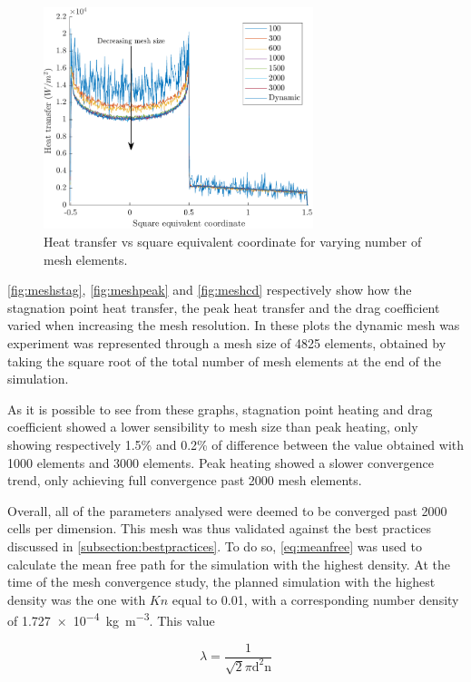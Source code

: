 \begin{figure}
    \centering
    \includegraphics[width=0.7\textwidth]{Images/3. Methodology/Mesh convergence/meshsec.pdf}
    \caption{Heat transfer vs square equivalent coordinate for varying number of mesh elements.}
    \label{fig:meshsec}
\end{figure}

\autoref{fig:meshstag}, \autoref{fig:meshpeak} and \autoref{fig:meshcd} respectively show how the stagnation point heat transfer, the peak heat transfer and the drag coefficient varied when increasing the mesh resolution. In these plots the dynamic mesh was experiment was represented through a mesh size of 4825 elements, obtained by taking the square root of the total number of mesh elements at the end of the simulation.

As it is possible to see from these graphs, stagnation point heating and drag coefficient showed a lower sensibility to mesh size than peak heating, only showing respectively 1.5\% and 0.2\% of difference between the value obtained with 1000 elements and 3000 elements. Peak heating showed a slower convergence trend, only achieving full convergence past 2000 mesh elements.

Overall, all of the parameters analysed were deemed to be converged past 2000 cells per dimension. This mesh was thus validated against the best practices discussed in \autoref{subsection:bestpractices}. To do so, \autoref{eq:meanfree} was used to calculate the mean free path for the simulation with the highest density. At the time of the mesh convergence study, the planned simulation with the highest density was the one with $Kn$ equal to 0.01, with a corresponding number density of \qty{1.727e-4}{\kg\per\m^3}. This value 

\begin{equation}
    \lambda=\frac{1}{\sqrt{2} \pi \mathrm{d}^2 \mathrm{n}}
\end{equation}

